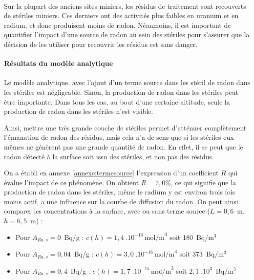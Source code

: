 \documentclass{article}
\begin{document}
\paragraph{} Sur la plupart des anciens sites miniers, les résidus de traitement sont recouverts de stériles miniers. Ces derniers ont des activités plus faibles en uranium et en radium, et donc produisent moins de radon. Néanmoins, il est important de quantifier l'impact d'une source de radon au sein des stériles pour s'assurer que la décision de les utiliser pour recouvrir les résidus est sans danger.

\paragraph{Résultats du modèle analytique}

\paragraph{} Le modèle analytique, avec l'ajout d'un terme source dans les stéril de radon dans les stériles est négligeable. Sinon, la production de radon dans les stériles peut être importante. Dans tous les cas, au bout d'une certaine altitude, seule la production de radon dans les stériles n'est visible.

Ainsi, mettre une très grande couche de stériles permet d'atténuer complètement l'émanation de radon des résidus, mais cela n'a de sens que si les stériles eux-mêmes ne génèrent pas une grande quantité de radon. En effet, il se peut que le radon détecté à la surface soit issu des stériles, et non pas des résidus.

On a établi en annexe \ref{annexe:termesource} l'expression d'un coefficient $R$ qui évalue l'impact de ce phénomène. On obtient $ R=7,0\%$, ce qui signifie que la production de radon dans les stériles, même le radium y est environ trois fois moins actif, a une influence sur la courbe de diffusion du radon. On peut ainsi comparer les concentrations à la surface, avec ou sans terme source ($L=0,6$~m, $h=6,5$~m) :
\begin{itemize}
  \item Pour $A_{Ra,s}=0$~Bq/g : $c(h) = 1,4 \; .10^{-16} \, \text{mol/m}^3$ soit 180~Bq/m$^3$
  \item Pour $A_{Ra,s}=0,04$~Bq/g : $c(h) = 3,0 \; .10^{-16} \, \text{mol/m}^3$ soit 373~Bq/m$^3$
  \item Pour $A_{Ra,s}=0,4$~Bq/g : $c(h) = 1,7 \; .10^{-15} \, \text{mol/m}^3$ soit $2,1 \; .10^3$~Bq/m$^3$
\end{itemize}
\end{document}
